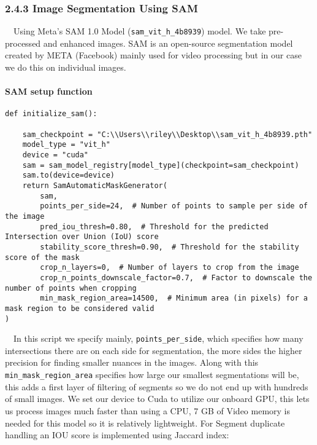 \documentclass{article}
\begin{document}
\subsubsection*{2.4.3 Image Segmentation Using SAM}
$\quad$Using Meta's SAM 1.0 Model (\texttt{sam\_vit\_h\_4b8939}) model. We take pre-processed and enhanced images. SAM is an open-source segmentation model created by META (Facebook) mainly used for video processing but in our case we do this on individual images. 

\paragraph{SAM setup function}

\begingroup\footnotesize
\begin{verbatim}
def initialize_sam():

    sam_checkpoint = "C:\\Users\\riley\\Desktop\\sam_vit_h_4b8939.pth"  
    model_type = "vit_h"
    device = "cuda"
    sam = sam_model_registry[model_type](checkpoint=sam_checkpoint)
    sam.to(device=device)
    return SamAutomaticMaskGenerator(
        sam,
        points_per_side=24,  # Number of points to sample per side of the image
        pred_iou_thresh=0.80,  # Threshold for the predicted Intersection over Union (IoU) score
        stability_score_thresh=0.90,  # Threshold for the stability score of the mask
        crop_n_layers=0,  # Number of layers to crop from the image
        crop_n_points_downscale_factor=0.7,  # Factor to downscale the number of points when cropping
        min_mask_region_area=14500,  # Minimum area (in pixels) for a mask region to be considered valid
)
\end{verbatim}
\endgroup

$\quad$In this script we specify mainly, \texttt{points\_per\_side}, which specifies how many intersections there are on each side for segmentation, the more sides the higher precision for finding smaller nuances in the images. Along with this \texttt{min\_mask\_region\_area} specifies how large our smallest segmentations will be, this adds a first layer of filtering of segments so we do not end up with hundreds of small images. We set our device to Cuda to utilize our onboard GPU, this lets us process images much faster than using a CPU, 7 GB of Video memory is needed for this model so it is relatively lightweight. For Segment duplicate handling an IOU score is implemented using Jaccard index:
\end{document}
